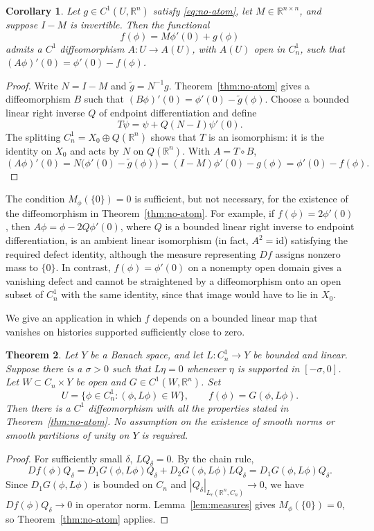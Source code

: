 \documentclass[11pt]{article}
\newtheorem{theorem}{Theorem}[section]
\newtheorem{corollary}[theorem]{Corollary}
\newcommand{\Lc}{L_c}
\newcommand{\id}{\mathrm{id}}
\begin{document}
\begin{corollary}\label{cor:coupling}
Let $g\in C^1(U,\mathbb R^n)$ satisfy \eqref{eq:no-atom}, let $M\in\mathbb R^{n\times n}$, and suppose $I-M$ is invertible. Then the functional
\[
 f(\phi)=M\phi'(0)+g(\phi)
\]
admits a $C^1$ diffeomorphism
$A:U\to A(U)$, with $A(U)$ open in $C_n^1$,
such that
$(A\phi)'(0)=\phi'(0)-f(\phi)$.
\end{corollary}
\begin{proof}
Write $N=I-M$ and $\widetilde g=N^{-1}g$. Theorem~\ref{thm:no-atom} gives a diffeomorphism $B$ such that $(B\phi)'(0)=\phi'(0)-\widetilde g(\phi)$. Choose a bounded linear right inverse $Q$ of endpoint differentiation and define
\[
 T\psi=\psi+Q(N-I)\psi'(0).
\]
The splitting $C_n^1=X_0\oplus Q(\mathbb R^n)$ shows that $T$ is an isomorphism: it is the identity on $X_0$ and acts by $N$ on $Q(\mathbb R^n)$. With $A=T\circ B$,
\[
 (A\phi)'(0)=N\bigl(\phi'(0)-\widetilde g(\phi)\bigr)
  =(I-M)\phi'(0)-g(\phi)=\phi'(0)-f(\phi).
\]
\end{proof}

The condition $M_\phi(\{0\})=0$ is sufficient, but not necessary, for the existence of the diffeomorphism in Theorem~\ref{thm:no-atom}. For example, if $f(\phi)=2\phi'(0)$, then
$A\phi=\phi-2Q\phi'(0)$, where $Q$ is a bounded linear
right inverse to endpoint differentiation, is an ambient linear
isomorphism (in fact, $A^2=\id$) satisfying the required defect
identity, although the measure representing $Df$ assigns nonzero
mass to $\{0\}$. In contrast, $f(\phi)=\phi'(0)$ on a nonempty open domain gives a vanishing defect and cannot be straightened by a diffeomorphism onto an open subset of $C_n^1$ with the same identity, since that image would have to lie in $X_0$.

We give an application in which $f$ depends on a bounded linear map
that vanishes on histories supported sufficiently close to zero.

\begin{theorem}\label{thm:remote}
Let $Y$ be a Banach space, and let $L:C_n^1\to Y$ be bounded and linear. Suppose there is a $\sigma>0$ such that $L\eta=0$ whenever $\eta$ is supported in $[-\sigma,0]$. Let $W\subset C_n\times Y$ be open and $G\in C^1(W,\mathbb R^n)$. Set
\[
 U=\{\phi\in C_n^1:(\phi,L\phi)\in W\},\qquad
 f(\phi)=G(\phi,L\phi).
\]
Then there is a $C^1$ diffeomorphism with all the properties stated
in Theorem~\ref{thm:no-atom}. No assumption on the existence of
smooth norms or smooth partitions of unity on $Y$ is required.
\end{theorem}
\begin{proof}
For sufficiently small $\delta$, $LQ_\delta=0$. By the chain rule,
\[
 Df(\phi)Q_\delta
 =D_1G(\phi,L\phi)Q_\delta
   +D_2G(\phi,L\phi)LQ_\delta
 =D_1G(\phi,L\phi)Q_\delta.
\]
Since $D_1G(\phi,L\phi)$ is bounded on $C_n$ and
$|Q_\delta|_{\Lc(\mathbb R^n,C_n)}\to0$, we have
$Df(\phi)Q_\delta\to0$ in operator norm. Lemma~\ref{lem:measures}
gives $M_\phi(\{0\})=0$, so Theorem~\ref{thm:no-atom} applies.
\end{proof}
\end{document}
